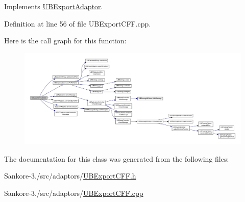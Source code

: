 Implements \hyperlink{class_u_b_export_adaptor_a9333b1d118d0bf445acbda90ae35135d}{U\-B\-Export\-Adaptor}.



Definition at line 56 of file U\-B\-Export\-C\-F\-F.\-cpp.



Here is the call graph for this function\-:
\nopagebreak
\begin{figure}[H]
\begin{center}
\leavevmode
\includegraphics[width=350pt]{d8/d52/class_u_b_export_c_f_f_aa7f031dc0cbe1f50f93bcb5e12c7151c_cgraph}
\end{center}
\end{figure}




The documentation for this class was generated from the following files\-:\begin{DoxyCompactItemize}
\item 
Sankore-\/3./src/adaptors/\hyperlink{_u_b_export_c_f_f_8h}{U\-B\-Export\-C\-F\-F.\-h}\item 
Sankore-\/3./src/adaptors/\hyperlink{_u_b_export_c_f_f_8cpp}{U\-B\-Export\-C\-F\-F.\-cpp}\end{DoxyCompactItemize}
